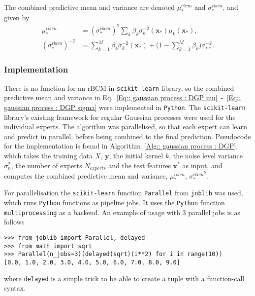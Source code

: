 \documentclass[twoside,english]{uiofysmaster}
\begin{document}
The combined predictive mean and variance are denoted $\mu^{rbcm}_*$ and $\sigma_*^{rbcm}$, and given by
\begin{align}
\mu_*^{rbcm} &= (\sigma_*^{rbcm})^2 \sum_k \beta_k \sigma_k^{-2} (\textbf{x}_*) \mu_k (\textbf{x}_*),\label{Eq:: gaussian process : DGP mu} \\
(\sigma_*^{rbcm})^{-2} &= \sum_{k=1}^M \beta_k \sigma_k^{-2} (\textbf{x}_*) + \big(1 - \sum_{k=1}^M \beta_k \big) \sigma_{**}^{-2}.\label{Eq:: gaussian process : DGP sigma}
\end{align}


\subsubsection{Implementation}

There is no function for an rBCM in \verb|scikit-learn| library, so the combined predictive mean and variance in Eq.~\ref{Eq:: gaussian process : DGP mu}~-~\ref{Eq:: gaussian process : DGP sigma} were implemented in \verb|Python|. The \verb|scikit-learn| library's existing framework for regular Gaussian processes were used for the individual experts. The algorithm was parallelised, so that each expert can learn and predict in parallel, before being combined to the final prediction. Pseudocode for the implementation is found in Algorithm~\ref{Alg:: gaussian process : DGP}, which takes the training data $X$, $\textbf{y}$, the initial kernel $k$, the noise level variance $\sigma_n^2$, the number of experts $N_{experts}$ and the test features $\textbf{x}^*$ as input, and computes the combined predictive mean and variance, $\mu^{rbcm}_*$, ${\sigma_*^{rbcm}}^2$.

For parallelisation the \verb|scikit-learn| function \verb|Parallel| from \verb|joblib| was used, which runs \verb|Python| functions as pipeline jobs. It uses the \verb|Python| function \verb|multiprocessing| as a backend. An example of usage with 3 parallel jobs is as follows
\begin{lstlisting}
>>> from joblib import Parallel, delayed
>>> from math import sqrt
>>> Parallel(n_jobs=3)(delayed(sqrt)(i**2) for i in range(10))
[0.0, 1.0, 2.0, 3.0, 4.0, 5.0, 6.0, 7.0, 8.0, 9.0]
\end{lstlisting}
where \verb|delayed| is a simple trick to be able to create a tuple with a function-call syntax.
\end{document}
